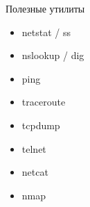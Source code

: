 \begin{frame}{Полезные утилиты}
	\begin{center}
		\begin{itemize}
			\item netstat / ss
			\item nslookup / dig
			\item ping
			\item traceroute
			\item tcpdump
			\item telnet
			\item netcat
			\item nmap
		\end{itemize}
	\end{center}

\end{frame}


%
%
%	
%
%	
%	
%
%
%

